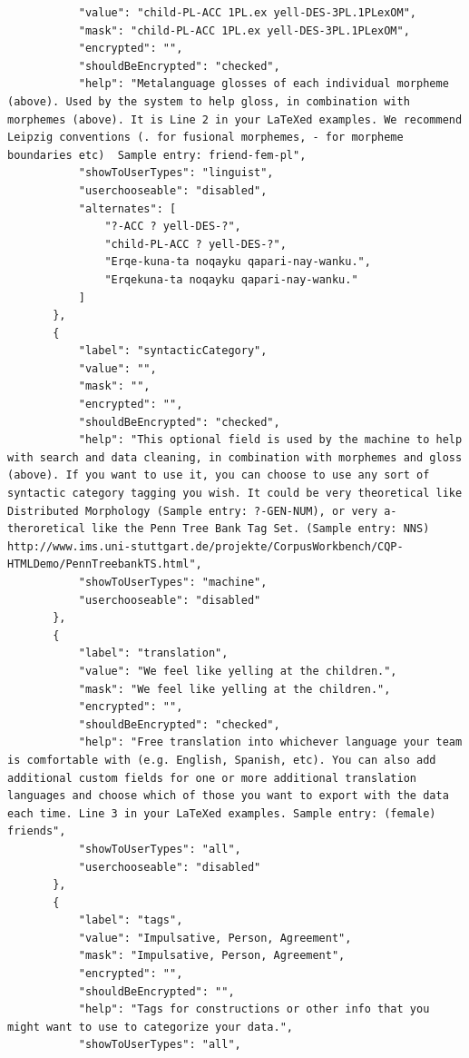 \documentclass[12pt]{article}
\begin{document}
\begin{verbatim}
           "value": "child-PL-ACC 1PL.ex yell-DES-3PL.1PLexOM",
           "mask": "child-PL-ACC 1PL.ex yell-DES-3PL.1PLexOM",
           "encrypted": "",
           "shouldBeEncrypted": "checked",
           "help": "Metalanguage glosses of each individual morpheme (above). Used by the system to help gloss, in combination with morphemes (above). It is Line 2 in your LaTeXed examples. We recommend Leipzig conventions (. for fusional morphemes, - for morpheme boundaries etc)  Sample entry: friend-fem-pl",
           "showToUserTypes": "linguist",
           "userchooseable": "disabled",
           "alternates": [
               "?-ACC ? yell-DES-?",
               "child-PL-ACC ? yell-DES-?",
               "Erqe-kuna-ta noqayku qapari-nay-wanku.",
               "Erqekuna-ta noqayku qapari-nay-wanku."
           ]
       },
       {
           "label": "syntacticCategory",
           "value": "",
           "mask": "",
           "encrypted": "",
           "shouldBeEncrypted": "checked",
           "help": "This optional field is used by the machine to help with search and data cleaning, in combination with morphemes and gloss (above). If you want to use it, you can choose to use any sort of syntactic category tagging you wish. It could be very theoretical like Distributed Morphology (Sample entry: ?-GEN-NUM), or very a-theroretical like the Penn Tree Bank Tag Set. (Sample entry: NNS) http://www.ims.uni-stuttgart.de/projekte/CorpusWorkbench/CQP-HTMLDemo/PennTreebankTS.html",
           "showToUserTypes": "machine",
           "userchooseable": "disabled"
       },
       {
           "label": "translation",
           "value": "We feel like yelling at the children.",
           "mask": "We feel like yelling at the children.",
           "encrypted": "",
           "shouldBeEncrypted": "checked",
           "help": "Free translation into whichever language your team is comfortable with (e.g. English, Spanish, etc). You can also add additional custom fields for one or more additional translation languages and choose which of those you want to export with the data each time. Line 3 in your LaTeXed examples. Sample entry: (female) friends",
           "showToUserTypes": "all",
           "userchooseable": "disabled"
       },
       {
           "label": "tags",
           "value": "Impulsative, Person, Agreement",
           "mask": "Impulsative, Person, Agreement",
           "encrypted": "",
           "shouldBeEncrypted": "",
           "help": "Tags for constructions or other info that you might want to use to categorize your data.",
           "showToUserTypes": "all",

\end{verbatim}
\end{document}
